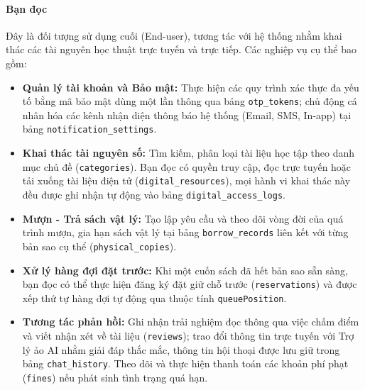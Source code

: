 \paragraph{Bạn đọc}
Đây là đối tượng sử dụng cuối (End-user), tương tác với hệ thống nhằm khai thác các tài nguyên học thuật trực tuyến và trực tiếp. Các nghiệp vụ cụ thể bao gồm:
\begin{itemize}
    \item \textbf{Quản lý tài khoản và Bảo mật:} Thực hiện các quy trình xác thực đa yếu tố bằng mã bảo mật dùng một lần thông qua bảng \texttt{otp\_tokens}; chủ động cá nhân hóa các kênh nhận diện thông báo hệ thống (Email, SMS, In-app) tại bảng \texttt{notification\_settings}.
    \item \textbf{Khai thác tài nguyên số:} Tìm kiếm, phân loại tài liệu học tập theo danh mục chủ đề (\texttt{categories}). Bạn đọc có quyền truy cập, đọc trực tuyến hoặc tải xuống tài liệu điện tử (\texttt{digital\_resources}), mọi hành vi khai thác này đều được ghi nhận tự động vào bảng \texttt{digital\_access\_logs}.
    \item \textbf{Mượn - Trả sách vật lý:} Tạo lập yêu cầu và theo dõi vòng đời của quá trình mượn, gia hạn sách vật lý tại bảng \texttt{borrow\_records} liên kết với từng bản sao cụ thể (\texttt{physical\_copies}).
    \item \textbf{Xử lý hàng đợi đặt trước:} Khi một cuốn sách đã hết bản sao sẵn sàng, bạn đọc có thể thực hiện đăng ký đặt giữ chỗ trước (\texttt{reservations}) và được xếp thứ tự hàng đợi tự động qua thuộc tính \texttt{queuePosition}.
    \item \textbf{Tương tác phản hồi:} Ghi nhận trải nghiệm đọc thông qua việc chấm điểm và viết nhận xét về tài liệu (\texttt{reviews}); trao đổi thông tin trực tuyến với Trợ lý ảo AI nhằm giải đáp thắc mắc, thông tin hội thoại được lưu giữ trong bảng \texttt{chat\_history}. Theo dõi và thực hiện thanh toán các khoản phí phạt (\texttt{fines}) nếu phát sinh tình trạng quá hạn.
\end{itemize}

